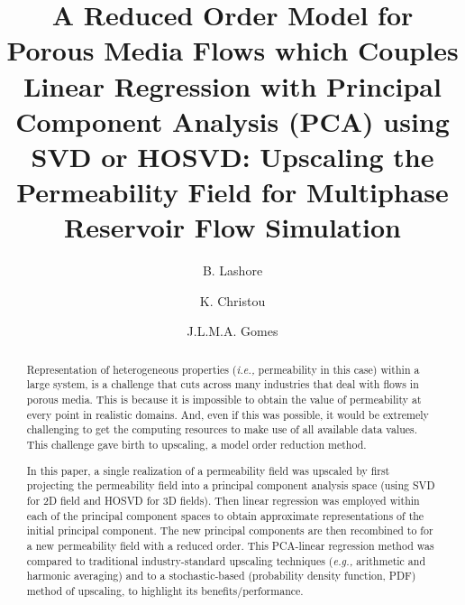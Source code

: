 \documentclass[preprint,12pt]{elsarticle}
\newcommand{\eg}{{\it e.g., }}
\newcommand{\ie}{{\it i.e., }}
\begin{document}
\begin{frontmatter}



\title{A Reduced Order Model for Porous Media Flows which Couples Linear Regression with Principal Component Analysis (PCA) using SVD or HOSVD: Upscaling the Permeability Field for Multiphase Reservoir Flow Simulation}
\author[UoA]{B. Lashore} \author[UoA]{K. Christou} \author[UoA]{J.L.M.A. Gomes}
\address[UoA]{Mechanics of Fluids, Soils \& Structures Research Group \\ School of Engineering, University of Aberdeen, UK}


\begin{abstract}

Representation of heterogeneous properties (\ie permeability in this case) within a large system, is a challenge that cuts across many industries that deal with flows in porous media. This is because it is impossible to obtain the value of permeability at every point in realistic domains. And, even if this was possible, it would be extremely challenging to get the computing resources to make use of all available data values. This challenge gave birth to upscaling, a model order reduction method.

In this paper, a single realization of a permeability field was upscaled by first projecting the permeability field into a principal component analysis space (using SVD for 2D field and HOSVD for 3D fields). Then linear regression was employed within each of the principal component spaces to obtain approximate representations of the initial principal component. The new principal components are then recombined to for a new permeability field with a reduced order. This PCA-linear regression method was compared to traditional industry-standard upscaling techniques (\eg arithmetic and harmonic averaging) and to a stochastic-based (probability density function, PDF) method of upscaling, to highlight its benefits/performance.


\end{abstract}
\end{frontmatter}
\end{document}
